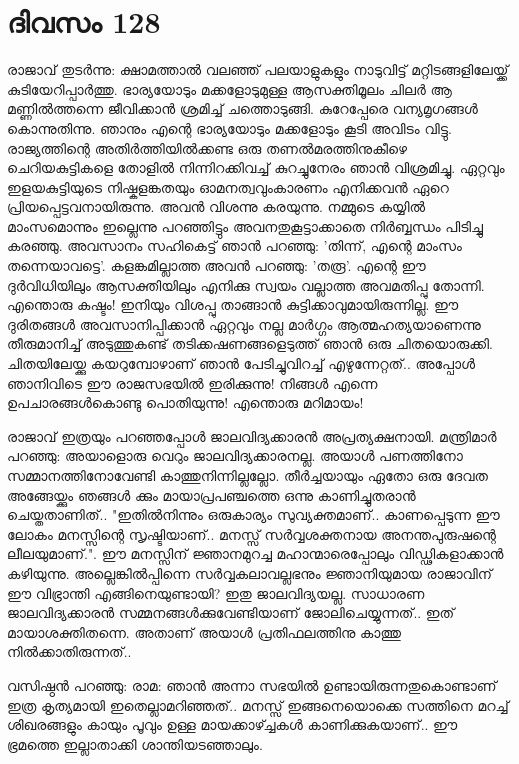 \newpage
\section{ദിവസം 128}


രാജാവ്‌ തുടര്‍ന്നു: ക്ഷാമത്താല്‍ വലഞ്ഞ്‌ പലയാളുകളും നാടുവിട്ട്‌ മറ്റിടങ്ങളിലേയ്ക്ക്‌ കുടിയേറിപ്പാര്‍ത്തു. ഭാര്യയോടും മക്കളോടുമുള്ള ആസക്തിമൂലം ചിലര്‍ ആ മണ്ണില്‍ത്തന്നെ ജീവിക്കാന്‍ ശ്രമിച്ച് ചത്തൊടുങ്ങി. കുറേപ്പേരെ വന്യമൃഗങ്ങള്‍ കൊന്നുതിന്നു. ഞാനും എന്റെ ഭാര്യയോടും മക്കളോടും കൂടി അവിടം വിട്ടു. രാജ്യത്തിന്റെ അതിര്‍ത്തിയില്‍ക്കണ്ട ഒരു തണല്‍മരത്തിനുകീഴെ ചെറിയകുട്ടികളെ തോളില്‍ നിന്നിറക്കിവച്ച്‌ കുറച്ചുനേരം ഞാന്‍ വിശ്രമിച്ചു. ഏറ്റവും ഇളയകുട്ടിയുടെ നിഷ്കളങ്കതയും ഓമനത്വവുംകാരണം എനിക്കവന്‍ ഏറെ പ്രിയപ്പെട്ടവനായിരുന്നു. അവന്‍ വിശന്നു കരയുന്നു. നമ്മുടെ കയ്യില്‍ മാംസമൊന്നും ഇല്ലെന്നു പറഞ്ഞിട്ടും അവനതുകൂട്ടാക്കാതെ നിര്‍ബ്ബന്ധം പിടിച്ചു കരഞ്ഞു. അവസാനം സഹികെട്ട്‌ ഞാന്‍ പറഞ്ഞു: 'തിന്ന്, എന്റെ മാംസം തന്നെയാവട്ടെ'. കളങ്കമില്ലാത്ത അവന്‍ പറഞ്ഞു: 'തരൂ'. എന്റെ ഈ ദുര്‍വിധിയിലും ആസക്തിയിലും  എനിക്കു  സ്വയം വല്ലാത്ത അവമതിപ്പു തോന്നി. എന്തൊരു കഷ്ടം! ഇനിയും വിശപ്പു താങ്ങാന്‍ കുട്ടിക്കാവുമായിരുന്നില്ല. ഈ ദുരിതങ്ങള്‍ അവസാനിപ്പിക്കാന്‍ ഏറ്റവും നല്ല മാര്‍ഗ്ഗം ആത്മഹത്യയാണെന്നു തീരുമാനിച്ച്‌ അടുത്തുകണ്ട്‌ തടിക്കഷണങ്ങളെടുത്ത്‌ ഞാന്‍ ഒരു ചിതയൊരുക്കി. ചിതയിലേയ്ക്കു കയറുമ്പോഴാണ്‌ ഞാന്‍ പേടിച്ചുവിറച്ച്‌ എഴുന്നേറ്റത്‌.. അപ്പോള്‍ ഞാനിവിടെ ഈ രാജസഭയില്‍ ഇരിക്കുന്നു! നിങ്ങള്‍ എന്നെ ഉപചാരങ്ങള്‍കൊണ്ടു പൊതിയുന്നു! എന്തൊരു മറിമായം!

രാജാവ്‌ ഇത്രയും പറഞ്ഞപ്പോള്‍ ജാലവിദ്യക്കാരന്‍ അപ്രത്യക്ഷനായി. മന്ത്രിമാര്‍ പറഞ്ഞു: അയാളൊരു വെറും ജാലവിദ്യക്കാരനല്ല. അയാള്‍ പണത്തിനോ സമ്മാനത്തിനോവേണ്ടി കാത്തുനിന്നില്ലല്ലോ. തീര്‍ച്ചയായും ഏതോ ഒരു ദേവത അങ്ങേയ്ക്കും ഞങ്ങള്‍ ക്കും മായാപ്രപഞ്ചത്തെ ഒന്നു കാണിച്ചുതരാന്‍ ചെയ്തതാണിത്‌.. "ഇതില്‍നിന്നും ഒരുകാര്യം സുവ്യക്തമാണ്‌.. കാണപ്പെടുന്ന ഈ ലോകം മനസ്സിന്റെ സൃഷ്ടിയാണ്‌.. മനസ്സ്‌ സര്‍വ്വശക്തനായ അനന്തപുരുഷന്റെ ലീലയുമാണ്‌.". ഈ മനസ്സിന്‌ ജ്ഞാനമുറച്ച മഹാന്മാരെപ്പോലും വിഡ്ഢികളാക്കാന്‍ കഴിയുന്നു. അല്ലെങ്കില്‍പ്പിന്നെ സര്‍വ്വകലാവല്ലഭനും ജ്ഞാനിയുമായ രാജാവിന്‌ ഈ വിഭ്രാന്തി എങ്ങിനെയുണ്ടായി? ഇതു ജാലവിദ്യയല്ല. സാധാരണ ജാലവിദ്യക്കാരന്‍ സമ്മനങ്ങള്‍ക്കുവേണ്ടിയാണ്‌ ജോലിചെയ്യുന്നത്‌.. ഇത്‌ മായാശക്തിതന്നെ. അതാണ്‌ അയാള്‍ പ്രതിഫലത്തിനു കാത്തു നില്‍ക്കാതിരുന്നത്‌..

വസിഷ്ഠന്‍ പറഞ്ഞു: രാമ: ഞാന്‍ അന്നാ സഭയില്‍ ഉണ്ടായിരുന്നതുകൊണ്ടാണ്‌ ഇത്ര കൃത്യമായി ഇതെല്ലാമറിഞ്ഞത്‌.. മനസ്സ്‌ ഇങ്ങനെയൊക്കെ സത്തിനെ മറച്ച്‌ ശിഖരങ്ങളും കായും പൂവും ഉള്ള മായക്കാഴ്ച്ചകള്‍ കാണിക്കുകയാണ്‌.. ഈ ഭ്രമത്തെ ഇല്ലാതാക്കി ശാന്തിയടഞ്ഞാലും. 


